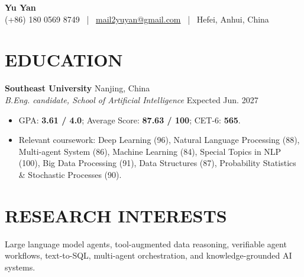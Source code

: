 \documentclass[10pt, a4paper]{article}
\newcommand{\entry}[4]{
  \vspace{0.2em}
  {\large\textbf{\color{PrimaryText}#1}} \hfill {\color{MutedText}#3} \\
  \textit{\color{PrimaryText}#2} \hfill {\small\color{MutedText}#4} \par
}
\begin{document}
\thispagestyle{empty}

\begin{center}
{\huge \bfseries \color{PrimaryText} Yu Yan}\\[0.9em]
{\large \color{MutedText}
(+86) 180 0569 8749 ~|~
\href{mailto:mail2yuyan@gmail.com}{mail2yuyan@gmail.com} ~|~
Hefei, Anhui, China
}
\end{center}

\vspace{-0.2em}
\section*{EDUCATION}
\entry{Southeast University}{B.Eng. candidate, School of Artificial Intelligence}{Nanjing, China}{Expected Jun. 2027}
\begin{itemize}
    \item GPA: \textbf{3.61 / 4.0}; Average Score: \textbf{87.63 / 100}; CET-6: \textbf{565}.
    \item {\small Relevant coursework: Deep Learning (96), Natural Language Processing (88), Multi-agent System (86), Machine Learning (84), Special Topics in NLP (100), Big Data Processing (91), Data Structures (87), Probability Statistics \& Stochastic Processes (90).}
\end{itemize}

\vspace{0.15em}
\section*{RESEARCH INTERESTS}
Large language model agents, tool-augmented data reasoning, verifiable agent workflows, text-to-SQL, multi-agent orchestration, and knowledge-grounded AI systems.

\vspace{0.35em}
\end{document}
